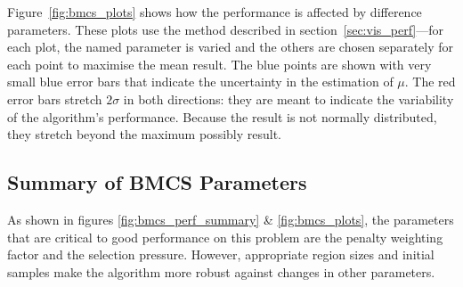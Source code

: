 \documentclass[10pt]{article}
\begin{document}
Figure~\ref{fig:bmcs_plots} shows how the performance is affected by
difference parameters. These plots use the method described in
section~\ref{sec:vis_perf}---for each plot, the named parameter is varied and
the others are chosen separately for each point to maximise the mean result.
The blue points are shown with very small blue error bars that indicate the
uncertainty in the estimation of $\mu$. The red error bars stretch $2 \sigma$
in both directions: they are meant to indicate the variability of the
algorithm's performance. Because the result is not normally distributed,
they stretch beyond the maximum possibly result.

\subsection{Summary of BMCS Parameters}

As shown in figures \ref{fig:bmcs_perf_summary} \& \ref{fig:bmcs_plots}, the
parameters that are critical to good performance on this problem are the
penalty weighting factor and the selection pressure. However, appropriate
region sizes and initial samples make the algorithm more robust against
changes in other parameters.
\end{document}
